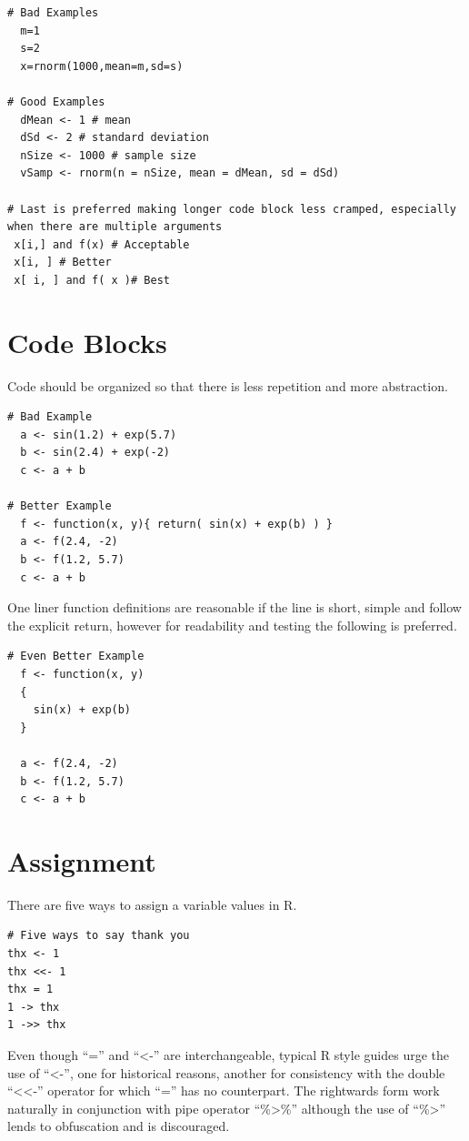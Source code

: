 \documentclass[
]{book}
\begin{document}
\begin{verbatim}
# Bad Examples
  m=1
  s=2
  x=rnorm(1000,mean=m,sd=s)

# Good Examples
  dMean <- 1 # mean
  dSd <- 2 # standard deviation
  nSize <- 1000 # sample size
  vSamp <- rnorm(n = nSize, mean = dMean, sd = dSd)

# Last is preferred making longer code block less cramped, especially when there are multiple arguments
 x[i,] and f(x) # Acceptable
 x[i, ] # Better
 x[ i, ] and f( x )# Best
\end{verbatim}

\hypertarget{code-blocks}{%
\section{Code Blocks}\label{code-blocks}}

Code should be organized so that there is less repetition and more abstraction.

\begin{verbatim}
# Bad Example
  a <- sin(1.2) + exp(5.7)
  b <- sin(2.4) + exp(-2)
  c <- a + b

# Better Example
  f <- function(x, y){ return( sin(x) + exp(b) ) }
  a <- f(2.4, -2)
  b <- f(1.2, 5.7)
  c <- a + b
\end{verbatim}

One liner function definitions are reasonable if the line is short, simple and follow the explicit return, however for readability and testing the following is preferred.

\begin{verbatim}
# Even Better Example
  f <- function(x, y)
  {
    sin(x) + exp(b)
  }
  
  a <- f(2.4, -2)
  b <- f(1.2, 5.7)
  c <- a + b
\end{verbatim}

\hypertarget{assignment}{%
\section{Assignment}\label{assignment}}

There are five ways to assign a variable values in R.

\begin{verbatim}
# Five ways to say thank you
thx <- 1
thx <<- 1
thx = 1
1 -> thx
1 ->> thx
\end{verbatim}

Even though ``='' and ``\textless-'' are interchangeable, typical R style guides
urge the use of ``\textless-'', one for historical reasons, another for
consistency with the double ``\textless\textless-'' operator for which ``='' has no
counterpart. The rightwards form work naturally in conjunction with
pipe operator ``\%\textgreater\%'' although the use of ``\%\textgreater{}'' lends to obfuscation and
is discouraged.
\end{document}
